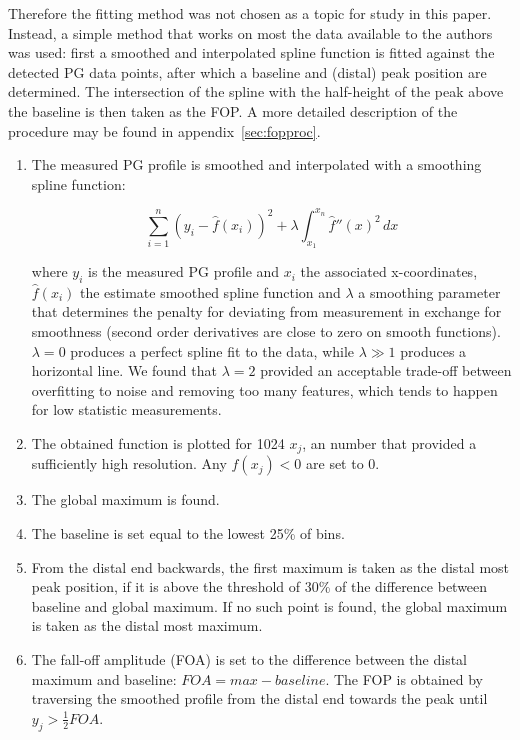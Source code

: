 \documentclass[a4paper,english]{article}
\begin{document}
Therefore the fitting method was not chosen as a topic for study in this paper. Instead, a simple method that works on most the data available to the authors was used: first a smoothed and interpolated spline function is fitted against the detected PG data points, after which a baseline and (distal) peak position are determined. The intersection of the spline with the half-height of the peak above the baseline is then taken as the FOP. A more detailed description of the procedure may be found in appendix~\ref{sec:fopproc}.


\begin{enumerate}[noitemsep]
\item The measured PG profile is smoothed and interpolated with a smoothing spline function:

\begin{equation}
\sum_{i=1}^n (y_i - \hat f(x_i))^2 + \lambda \int_{x_1}^{x_n} \hat f''(x)^2 \,dx
\end{equation}

where $y_i$ is the measured PG profile and $x_i$ the associated x-coordinates, $\hat f(x_i)$ the estimate smoothed spline function and $\lambda$ a smoothing parameter that determines the penalty for deviating from measurement in exchange for smoothness (second order derivatives are close to zero on smooth functions). $\lambda = 0$ produces a perfect spline fit to the data, while $\lambda \gg 1$ produces a horizontal line. We found that $\lambda = 2$ provided an acceptable trade-off between overfitting to noise and removing too many features, which tends to happen for low statistic measurements.
\item The obtained function is plotted for 1024 $x_j$, an number that provided a sufficiently high resolution. Any $f(x_j) < 0$ are set to $0$. 
\item The global maximum is found.
\item The baseline is set equal to the lowest 25\% of bins.
\item From the distal end backwards, the first maximum is taken as the distal most peak position, if it is above the threshold of 30\% of the difference between baseline and global maximum. If no such point is found, the global maximum is taken as the distal most maximum.
\item The fall-off amplitude (FOA) is set to the difference between the distal maximum and baseline: $FOA = max-baseline$. The FOP is obtained by traversing the smoothed profile from the distal end towards the peak until $y_j > \frac{1}{2}FOA$.
\end{enumerate}
\end{document}
